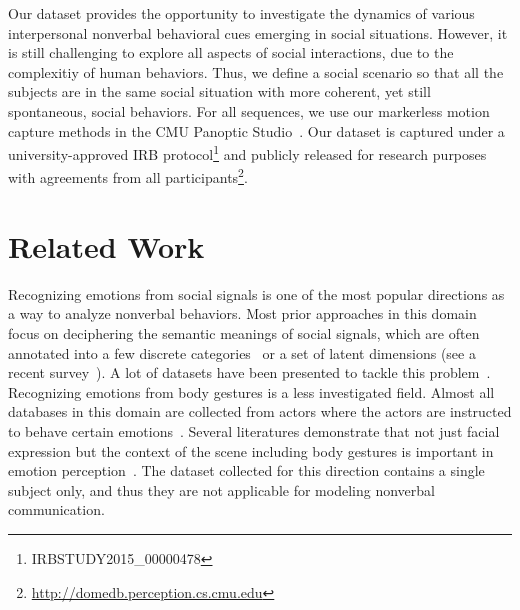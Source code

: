 Our dataset provides the opportunity to investigate the dynamics of various interpersonal nonverbal behavioral cues emerging in social situations. However, it is still challenging to explore all aspects of social interactions, due to the complexitiy of human behaviors. Thus, we define a social scenario so that all the subjects are in the same social situation with more coherent, yet still spontaneous, social behaviors. For all sequences, we use our markerless motion capture methods in the CMU Panoptic Studio~\cite{joo2017panoptic, joo2018}.  Our dataset is captured under a university-approved IRB protocol\footnote{IRBSTUDY2015\_00000478} and publicly released for research purposes with agreements from all participants\footnote{\url{http://domedb.perception.cs.cmu.edu}}. 


\section{Related Work}
Recognizing emotions from social signals is one of the most popular directions as a way to analyze nonverbal behaviors. Most prior approaches in this domain focus on deciphering the semantic meanings of social signals, which are often annotated into a few discrete categories~\cite{ekman1969} or a set of latent dimensions\cite{osgood1952nature, russell1979affective, plutchik2001nature} (see a recent survey~\cite{noroozi2018survey}). A lot of datasets have been presented to tackle this problem~\cite{lucey2010extended,gross2010multi,dhall2013emotion, mollahosseini2016facial, fabian2016emotionet, mollahosseini2017affectnet}. Recognizing emotions from body gestures is a less investigated field. Almost all databases in this domain are collected from actors where the actors are instructed to behave certain emotions~\cite{gunes2006bimodal, banziger2012introducing, de2004modeling}. Several literatures demonstrate that not just facial expression but the context of the scene including body gestures is important in emotion perception~\cite{barrett2011context, aviezer2008angry}. The dataset collected for this direction contains a single subject only, and thus they are not applicable for modeling nonverbal communication.

